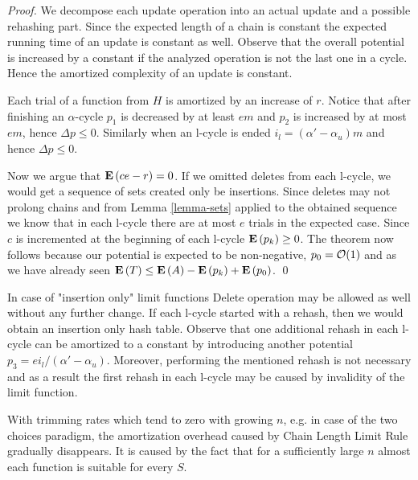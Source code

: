 \begin{proof}
We decompose each update operation into an actual update and a possible rehashing part. Since the expected length of a chain is constant the expected running time of an update is constant as well. Observe that the overall potential is increased by a constant if the analyzed operation is not the last one in a cycle. Hence the amortized complexity of an update is constant. 

Each trial of a function from $H$ is amortized by an increase of $r$. Notice that after finishing an $\alpha$-cycle $p_1$ is decreased by at least $em$ and $p_2$ is increased by at most $em$, hence $\Delta p \leq 0$. Similarly when an l-cycle is ended $i_l = (\alpha' - \alpha_u)m$ and hence $\Delta p \leq 0$. 

Now we argue that $\mathbf{E}\left(ce - r\right) = 0$. If we omitted deletes from each l-cycle, we would get a sequence of sets created only be insertions. Since deletes may not prolong chains and from Lemma \ref{lemma-sets} applied to the obtained sequence we know that in each l-cycle there are at most $e$ trials in the expected case. Since $c$ is incremented at the beginning of each l-cycle $\mathbf{E}\left(p_k\right) \geq 0$. The theorem now follows because our potential is expected to be non-negative, $p_0 = \mathcal{O}(1)$ and as we have already seen $\mathbf{E}\left(T\right) \leq \mathbf{E}\left(A\right) - \mathbf{E}\left(p_k\right) + \mathbf{E}\left(p_0\right)$.
\qed
\end{proof}

In case of "insertion only" limit functions Delete operation may be allowed as well without any further change. If each l-cycle started with a rehash, then we would obtain an insertion only hash table. Observe that one additional rehash in each l-cycle can be amortized to a constant by introducing another potential $p_3 = {ei_{l}}/{(\alpha' - \alpha_u)}$. Moreover, performing the mentioned rehash is not necessary and as a result the first rehash in each l-cycle may be caused by invalidity of the limit function.

With trimming rates which tend to zero with growing $n$, e.g. in case of the two choices paradigm, the amortization overhead caused by Chain Length Limit Rule gradually disappears. It is caused by the fact that for a sufficiently large $n$ almost each function is suitable for every $S$.
